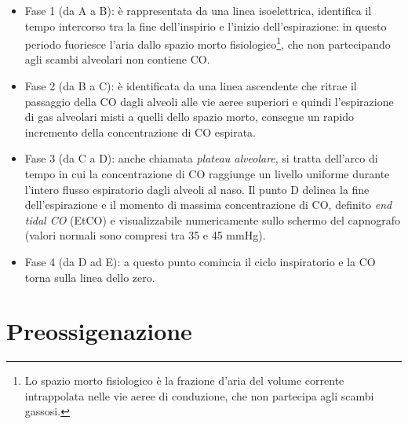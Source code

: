 \begin{itemize}
    \item Fase 1 (da A a B): è rappresentata da una linea isoelettrica, identifica il tempo intercorso tra la fine dell’inspirio e l’inizio dell’espirazione: in questo periodo fuoriesce l'aria dallo spazio morto fisiologico\footnote{Lo spazio morto fisiologico è la frazione d'aria del volume corrente intrappolata nelle vie aeree di conduzione, che non partecipa agli scambi gassosi.}, che non partecipando agli scambi alveolari non contiene CO.
    \item Fase 2 (da B a C): è identificata da una linea ascendente che ritrae il passaggio della CO dagli alveoli alle vie aeree superiori e quindi l'espirazione di gas alveolari misti a quelli dello spazio morto, consegue un rapido incremento della concentrazione di CO espirata.
    \item Fase 3 (da C a D): anche chiamata \emph{plateau alveolare}, si tratta dell'arco di tempo in cui la concentrazione di CO raggiunge un livello uniforme durante l'intero flusso espiratorio dagli alveoli al naso. Il punto D delinea la fine dell'espirazione e il momento di massima concentrazione di CO, definito \emph{end tidal CO} (EtCO) e visualizzabile numericamente sullo schermo del capnografo (valori normali sono compresi tra 35 e 45 mmHg).
    \item Fase 4 (da D ad E): a questo punto comincia il ciclo inspiratorio e la CO torna sulla linea dello zero. 
    
\end{itemize}



\section{Preossigenazione}

